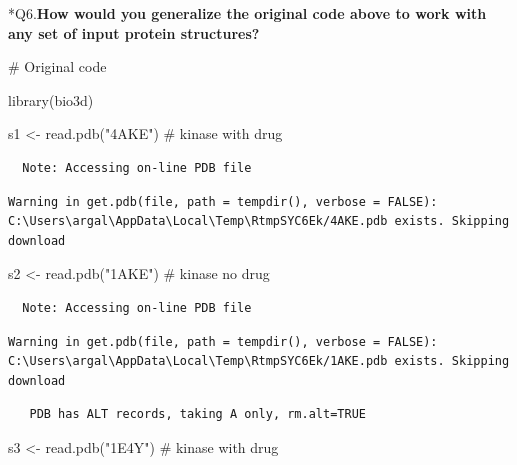 \documentclass[
  letterpaper,
  DIV=11,
  numbers=noendperiod]{scrartcl}
\newenvironment{Shaded}{\begin{snugshade}}{\end{snugshade}}
\newcommand{\CommentTok}[1]{\textcolor[rgb]{0.37,0.37,0.37}{#1}}
\newcommand{\FunctionTok}[1]{\textcolor[rgb]{0.28,0.35,0.67}{#1}}
\newcommand{\NormalTok}[1]{\textcolor[rgb]{0.00,0.23,0.31}{#1}}
\newcommand{\OtherTok}[1]{\textcolor[rgb]{0.00,0.23,0.31}{#1}}
\newcommand{\StringTok}[1]{\textcolor[rgb]{0.13,0.47,0.30}{#1}}
\begin{document}
*Q6.\textbf{How would you generalize the original code above to work
with any set of input protein structures?}

\begin{Shaded}
\begin{Highlighting}[]
\CommentTok{\# Original code}

\FunctionTok{library}\NormalTok{(bio3d)}


\NormalTok{s1 }\OtherTok{\textless{}{-}} \FunctionTok{read.pdb}\NormalTok{(}\StringTok{"4AKE"}\NormalTok{) }\CommentTok{\# kinase with drug}
\end{Highlighting}
\end{Shaded}

\begin{verbatim}
  Note: Accessing on-line PDB file
\end{verbatim}

\begin{verbatim}
Warning in get.pdb(file, path = tempdir(), verbose = FALSE):
C:\Users\argal\AppData\Local\Temp\RtmpSYC6Ek/4AKE.pdb exists. Skipping download
\end{verbatim}

\begin{Shaded}
\begin{Highlighting}[]
\NormalTok{s2 }\OtherTok{\textless{}{-}} \FunctionTok{read.pdb}\NormalTok{(}\StringTok{"1AKE"}\NormalTok{) }\CommentTok{\# kinase no drug}
\end{Highlighting}
\end{Shaded}

\begin{verbatim}
  Note: Accessing on-line PDB file
\end{verbatim}

\begin{verbatim}
Warning in get.pdb(file, path = tempdir(), verbose = FALSE):
C:\Users\argal\AppData\Local\Temp\RtmpSYC6Ek/1AKE.pdb exists. Skipping download
\end{verbatim}

\begin{verbatim}
   PDB has ALT records, taking A only, rm.alt=TRUE
\end{verbatim}

\begin{Shaded}
\begin{Highlighting}[]
\NormalTok{s3 }\OtherTok{\textless{}{-}} \FunctionTok{read.pdb}\NormalTok{(}\StringTok{"1E4Y"}\NormalTok{) }\CommentTok{\# kinase with drug}
\end{Highlighting}
\end{Shaded}
\end{document}
